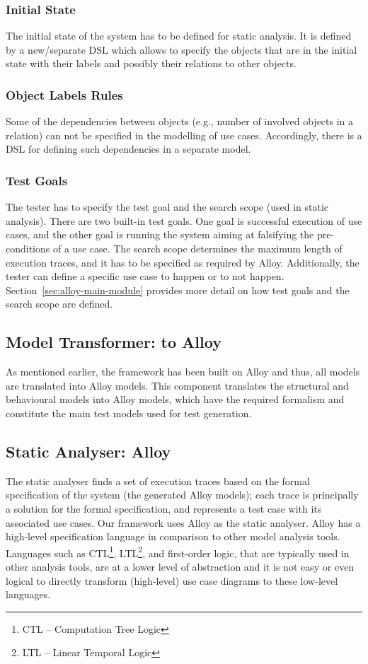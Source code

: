 \subsubsection{Initial State} 
The initial state of the system has to be defined for static analysis. It is defined by a new/separate DSL which allows to specify the objects that are in the initial state with their labels and possibly their relations to other objects.

\subsubsection{Object Labels Rules}
Some of the dependencies between objects (e.g., number of involved objects in a relation) can not be specified in the modelling of use cases. Accordingly, there is a DSL for defining such dependencies in a separate model.

\subsubsection{	Test Goals}
The tester has to specify the test goal and the search scope (used in static analysis). There are two built-in test goals. One goal is successful execution of use cases, and the other goal is running the system aiming at falsifying the pre-conditions of a use case.
The search scope determines the maximum length of execution traces, and it has to be specified as required by Alloy. Additionally, the tester can define a specific use case to happen or to not happen. Section~\ref{sec:alloy-main-module} provides more detail on how test goals and the search scope are defined.


\subsection{Model Transformer: to Alloy}
\label{sec:framework-overview-model-transformer}
As mentioned earlier, the framework has been built on Alloy and thus, all models are translated into Alloy models. This component translates the structural and behavioural models into Alloy models, which have the required formalism and constitute the main test models used for test generation.


\subsection{Static Analyser: Alloy}
\label{sec:framework-overview-static-analyser}
The static analyser finds a set of execution traces based on the formal specification of the system (the generated Alloy models); each trace is principally a solution for the formal specification, and represents a test case with its associated use cases. Our framework uses Alloy as the static analyser. Alloy has a high-level specification language in comparison to other model analysis tools. Languages such as CTL\footnote{CTL – Computation Tree Logic}, LTL\footnote{LTL – Linear Temporal Logic}, and first-order logic, that are typically used in other analysis tools, are at a lower level of abstraction and it is not easy or even logical to directly transform (high-level) use case diagrams to these low-level languages.


